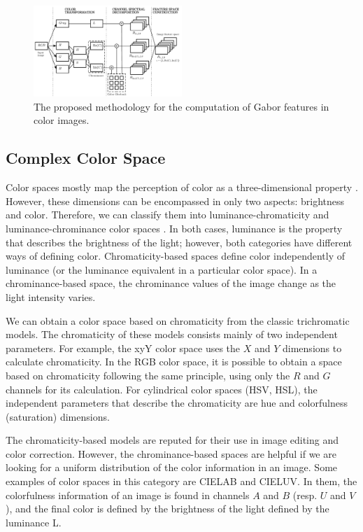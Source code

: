 \documentclass[journal]{IEEEtran}
\begin{document}
\begin{figure}[!ht]
	\centering
	\includegraphics[width=0.5\textwidth]{gabor_color_feature_extraction_diagram}
	\caption{The proposed methodology for the computation of Gabor features in color images.}\label{fig:proposed_pipeline_gabor_feature_extraction}
\end{figure}

\subsection{Complex Color Space}
Color spaces mostly map the perception of color as a three-dimensional property \cite{Douglas.Kerr:Online:2005}. However, these dimensions can be encompassed in only two aspects: brightness and color. Therefore, we can classify them into luminance-chromaticity and luminance-chrominance color spaces \cite{Kerr:Online:2003}. In both cases, luminance is the property that describes the brightness of the light; however, both categories have different ways of defining color. Chromaticity-based spaces define color independently of luminance (or the luminance equivalent in a particular color space). In a chrominance-based space, the chrominance values of the image change as the light intensity varies.
  
We can obtain a color space based on chromaticity from the classic trichromatic models. The chromaticity of these models consists mainly of two independent parameters. For example, the xyY color space uses the $X$ and $Y$ dimensions to calculate chromaticity. In the RGB color space, it is possible to obtain a space based on chromaticity following the same principle, using only the $R$ and $G$ channels for its calculation. For cylindrical color spaces (HSV, HSL), the independent parameters that describe the chromaticity are hue and colorfulness (saturation) dimensions.

The chromaticity-based models are reputed for their use in image editing and color correction. However, the chrominance-based spaces are helpful if we are looking for a uniform distribution of the color information in an image. Some examples of color spaces in this category are CIELAB and CIELUV. In them, the colorfulness information of an image is found in channels $A$ and $B$ (resp. $U$ and $V$), and the final color is defined by the brightness of the light defined by the luminance L.
\end{document}
